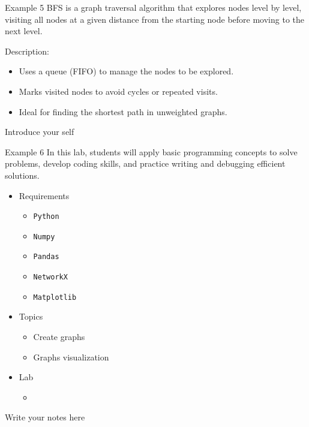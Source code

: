 \documentclass[aspectratio=169]{beamer}
\begin{document}
    \begin{frame}{Example 5}
        BFS is a graph traversal algorithm that explores nodes level by level, visiting all nodes at a given distance from the starting node before moving to the next level. \newline

        Description:
        \begin{itemize}
            \item Uses a queue (FIFO) to manage the nodes to be explored.
            \item Marks visited nodes to avoid cycles or repeated visits.
            \item Ideal for finding the shortest path in unweighted graphs.
        \end{itemize}

        \begin{note}
            {Introduce your self}
        \end{note}
    \end{frame}

    \begin{frame}{Example 6}
        In this lab, students will apply basic programming concepts to solve problems, develop coding skills, and practice writing and debugging efficient solutions. \newline

        \begin{itemize}
            \item Requirements
                \begin{itemize}
                    \item \texttt{Python}
                    \item \texttt{Numpy}
                    \item \texttt{Pandas}
                    \item \texttt{NetworkX}
                    \item \texttt{Matplotlib}
                \end{itemize}
            \item Topics 
                \begin{itemize}
                    \item Create graphs
                    \item Graphs visualization
                \end{itemize}
            \item Lab
                \begin{itemize}
                    \item \href{https://colab.research.google.com/}{
                        }
                \end{itemize}
        \end{itemize}

        \begin{note}
            {Write your notes here}
        \end{note}
    \end{frame}
\end{document}
